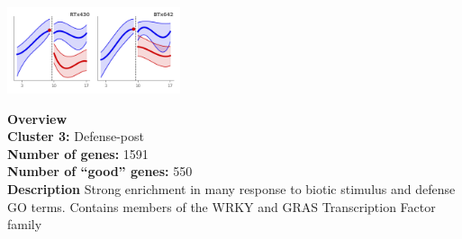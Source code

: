 \begin{multicols}{2}
\includegraphics[width=2in]{figures/clusters/leaf_Postflowering_2.png}
\columnbreak

\noindent \textbf{Overview}\\\textbf{Cluster 3:} Defense-post \\
\textbf{Number of genes:} 1591 \\
\textbf{Number of ``good'' genes:} 550 \\
\textbf{Description} Strong enrichment in many response to biotic stimulus and defense GO terms. Contains members of the WRKY and GRAS Transcription Factor family  \\
\end{multicols}

